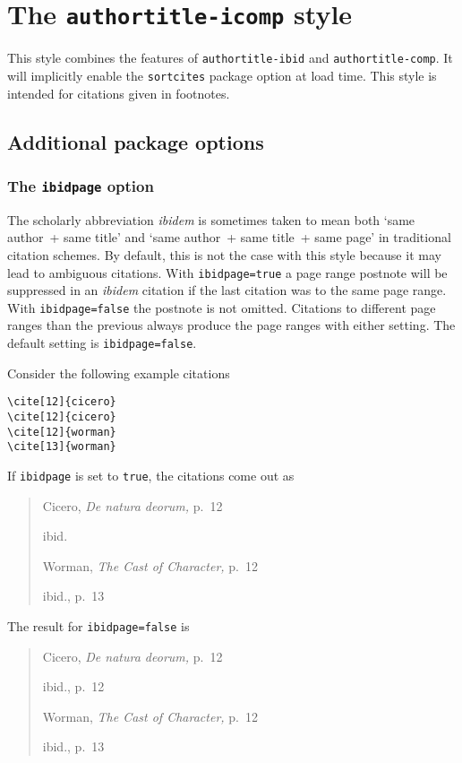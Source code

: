\documentclass[a4paper]{article}
\begin{document}
\section*{The \texttt{authortitle-icomp} style}

This style combines the features of \texttt{authortitle-ibid} and
\texttt{authortitle-comp}. It will implicitly enable the
\texttt{sortcites} package option at load time. This style is
intended for citations given in footnotes.

\subsection*{Additional package options}

\subsubsection*{The \texttt{ibidpage} option}

The scholarly abbreviation \emph{ibidem} is sometimes taken to mean
both `same author~+ same title' and `same author~+ same title~+ same
page' in traditional citation schemes. By default, this is not the
case with this style because it may lead to ambiguous citations.
With \texttt{ibidpage=true} a page range postnote will be suppressed
in an \emph{ibidem} citation if the last citation was to the same
page range. With \texttt{ibidpage=false} the postnote is not omitted.
Citations to different page ranges than the previous always produce
the page ranges with either setting.
The default setting is \texttt{ibidpage=false}.

Consider the following example citations
\begin{verbatim}
\cite[12]{cicero}
\cite[12]{cicero}
\cite[12]{worman}
\cite[13]{worman}
\end{verbatim}
%
If \texttt{ibidpage} is set to \texttt{true}, the citations
come out as
\begin{quote}
Cicero, \emph{De natura deorum,} p.~12

ibid.

Worman, \emph{The Cast of Character,} p.~12

ibid., p.~13
\end{quote}
%
The result for \texttt{ibidpage=false} is
\begin{quote}
Cicero, \emph{De natura deorum,} p.~12

ibid., p.~12

Worman, \emph{The Cast of Character,} p.~12

ibid., p.~13
\end{quote}
\end{document}
